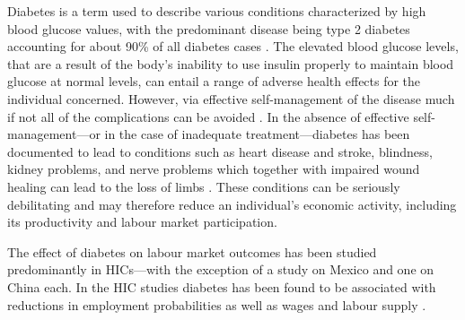 Diabetes is a term used to describe various conditions characterized by high blood glucose values, with the predominant disease being type 2 diabetes accounting for about 90\% of all diabetes cases \parencite{Sicree2009}. The elevated
blood glucose levels, that are a result of the body's inability to use insulin properly to maintain blood glucose at normal levels, can entail a range of adverse health effects for the individual concerned. However, via effective self-management of the disease much if not all of the complications can be avoided \parencite{Lim2011, Gregg2012}. In the absence of effective self-management---or in the case of inadequate treatment---diabetes has been documented to lead to conditions such as heart disease and stroke, blindness, kidney problems, and nerve problems which together with impaired wound healing can lead to the loss of limbs \parencite{Reynoso-Noveron2011}. These conditions can be seriously debilitating and may therefore reduce an individual's economic activity, including its productivity and labour market participation.

The effect of diabetes on labour market outcomes has been studied predominantly in \acp{HIC}---with the exception of a study on Mexico \autocite{Seuring2015} and one on China \parencite{Liu2014} each. In the \ac{HIC} studies diabetes has been found to be associated with reductions in employment probabilities as well as wages and labour supply \parencite{Brown2005,Brown2014,BrownIII2011,Minor2011,Minor2013,Minor2015,Latif2009,Seuring2015a}.

